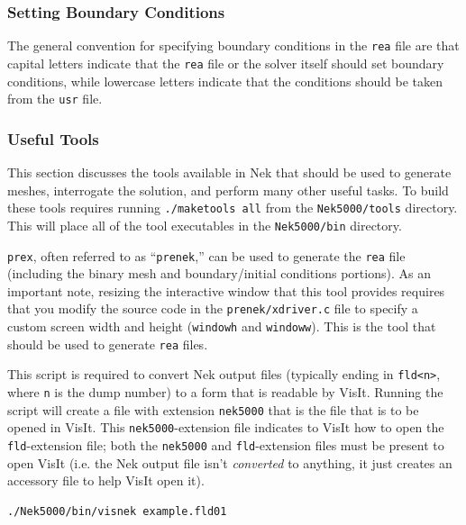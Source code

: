 \documentclass[10pt]{article}
\newcounter{subsubsubsection}[subsubsection]
\numberwithin{equation}{section} %
\begin{document}
\subsubsection{Setting Boundary Conditions}
The general convention for specifying boundary conditions in the {\tt rea} file are that capital letters indicate that the {\tt rea} file or the solver itself should set boundary conditions, while lowercase letters indicate that the conditions should be taken from the {\tt usr} file. 


\subsubsection{Useful Tools}
This section discusses the tools available in Nek that should be used to generate meshes, interrogate the solution, and perform many other useful tasks. To build these tools requires running {\tt ./maketools all} from the {\tt Nek5000/tools} directory. This will place all of the tool executables in the {\tt Nek5000/bin} directory.

{\tt prex}, often referred to as ``{\tt prenek},'' can be used to generate the {\tt rea} file (including the binary mesh and boundary/initial conditions portions). As an important note, resizing the interactive window that this tool provides requires that you modify the source code in the {\tt prenek/xdriver.c} file to specify a custom screen width and height ({\tt windowh} and {\tt windoww}). This is the tool that should be used to generate {\tt rea} files. 

This script is required to convert Nek output files (typically ending in {\tt fld<n>}, where {\tt n} is the dump number) to a form that is readable by VisIt. Running the script will create a file with extension {\tt nek5000} that is the file that is to be opened in VisIt. This {\tt nek5000}-extension file indicates to VisIt how to open the {\tt fld}-extension file; both the {\tt nek5000} and {\tt fld}-extension files must be present to open VisIt (i.e. the Nek output file isn't {\it converted} to anything, it just creates an accessory file to help VisIt open it).

\begin{lstlisting}
./Nek5000/bin/visnek example.fld01
\end{lstlisting}
\end{document}
